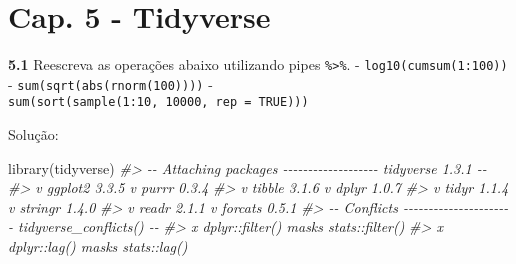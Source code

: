 \documentclass[
]{book}
\newenvironment{Shaded}{\begin{snugshade}}{\end{snugshade}}
\newcommand{\CommentTok}[1]{\textcolor[rgb]{0.56,0.35,0.01}{\textit{#1}}}
\newcommand{\FunctionTok}[1]{\textcolor[rgb]{0.00,0.00,0.00}{#1}}
\newcommand{\NormalTok}[1]{#1}
\begin{document}
\hypertarget{cap.-5---tidyverse}{%
\chapter*{Cap. 5 - Tidyverse}\label{cap.-5---tidyverse}}

\textbf{5.1}
Reescreva as operações abaixo utilizando pipes \texttt{\%\textgreater{}\%}.
- \texttt{log10(cumsum(1:100))}
- \texttt{sum(sqrt(abs(rnorm(100))))}
- \texttt{sum(sort(sample(1:10,\ 10000,\ rep\ =\ TRUE)))}

Solução:

\begin{Shaded}
\begin{Highlighting}[]
\FunctionTok{library}\NormalTok{(tidyverse)}
\CommentTok{\#\textgreater{} {-}{-} Attaching packages {-}{-}{-}{-}{-}{-}{-}{-}{-}{-}{-}{-}{-}{-}{-}{-}{-}{-}{-} tidyverse 1.3.1 {-}{-}}
\CommentTok{\#\textgreater{} v ggplot2 3.3.5     v purrr   0.3.4}
\CommentTok{\#\textgreater{} v tibble  3.1.6     v dplyr   1.0.7}
\CommentTok{\#\textgreater{} v tidyr   1.1.4     v stringr 1.4.0}
\CommentTok{\#\textgreater{} v readr   2.1.1     v forcats 0.5.1}
\CommentTok{\#\textgreater{} {-}{-} Conflicts {-}{-}{-}{-}{-}{-}{-}{-}{-}{-}{-}{-}{-}{-}{-}{-}{-}{-}{-}{-}{-}{-} tidyverse\_conflicts() {-}{-}}
\CommentTok{\#\textgreater{} x dplyr::filter() masks stats::filter()}
\CommentTok{\#\textgreater{} x dplyr::lag()    masks stats::lag()}


\end{Highlighting}
\end{Shaded}
\end{document}
